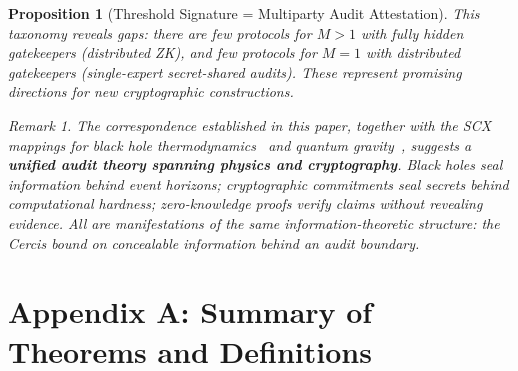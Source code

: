\documentclass[12pt,a4paper]{article}
\newtheorem{proposition}[theorem]{Proposition}
\theoremstyle{remark}
\newtheorem{remark}[theorem]{Remark}
\newcommand{\SCX}{\textsf{SCX}}
\newcommand{\Cercis}{\textsf{Cercis}}
\begin{document}
\begin{proposition}[Threshold Signature = Multiparty Audit Attestation]
This taxonomy reveals gaps: there are few protocols for $M > 1$ with fully hidden gatekeepers (distributed ZK), and few protocols for $M = 1$ with distributed gatekeepers (single-expert secret-shared audits). These represent promising directions for new cryptographic constructions.

\begin{remark}
\label{rem:unified_theory}
The correspondence established in this paper, together with the \SCX{} mappings for black hole thermodynamics~\cite{scx_black_hole} and quantum gravity~\cite{scx_qg_audit}, suggests a \textbf{unified audit theory spanning physics and cryptography}. Black holes seal information behind event horizons; cryptographic commitments seal secrets behind computational hardness; zero-knowledge proofs verify claims without revealing evidence. All are manifestations of the same information-theoretic structure: the \Cercis{} bound on concealable information behind an audit boundary.
\end{remark}


\section*{Appendix A: Summary of Theorems and Definitions}
\label{app:summary}


\end{proposition}
\end{document}
